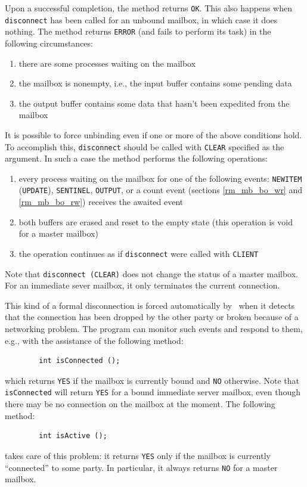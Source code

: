 \noindent
Upon a successful completion, the method returns {\tt OK}.
This also happens when {\tt disconnect} has been
called for an unbound mailbox, in which case it does nothing.
The method returns {\tt ERROR} (and fails to perform its task) in the
following circumstances:

\begin{enumerate}
\item
there are some processes waiting on the mailbox
\item
the mailbox is nonempty, i.e., the input buffer contains some pending data
\item
the output buffer contains some data that hasn't been expedited from the
mailbox
\end{enumerate}

It is possible to force unbinding even if one or more of the above
conditions hold.
To accomplish this, {\tt disconnect} should be called with {\tt CLEAR}
specified as the argument.
In such a case the method performs the following operations:

\begin{enumerate}
\item
every process waiting on the mailbox for one of the following
events: {\tt NEWITEM} ({\tt UPDATE}), {\tt SENTINEL}, {\tt OUTPUT},
or a count event (sections \ref{rm_mb_bo_wr} and \ref{rm_mb_bo_rw}) receives the
awaited event
\item
both buffers are erased and reset to the empty state (this operation
is void for a master mailbox)
\item
the operation continues as if {\tt disconnect} were called with
{\tt CLIENT}
\end{enumerate}

Note that {\tt disconnect~(CLEAR)} does not change the status of a
master mailbox.
For an immediate sever mailbox, it only terminates the current connection.

This kind of a formal disconnection is forced automatically by \smurph\ when
it detects that the connection has been dropped by the other party or
broken because of a networking problem.
The program can monitor such events and respond to them, e.g.,
with the assistance of the following method:
\begin{verbatim}
        int isConnected ();
\end{verbatim}
which returns {\tt YES} if the mailbox is currently bound and {\tt NO}
otherwise.
Note that {\tt isConnected} will return {\tt YES} for a bound immediate
server mailbox, even though there may be no connection on the
mailbox at the moment.
The following method:
\begin{verbatim}
        int isActive ();
\end{verbatim}
takes care of this problem: it
returns {\tt YES} only if the mailbox is currently ``connected'' to
some party.
In particular, it always returns {\tt NO} for a master mailbox.

